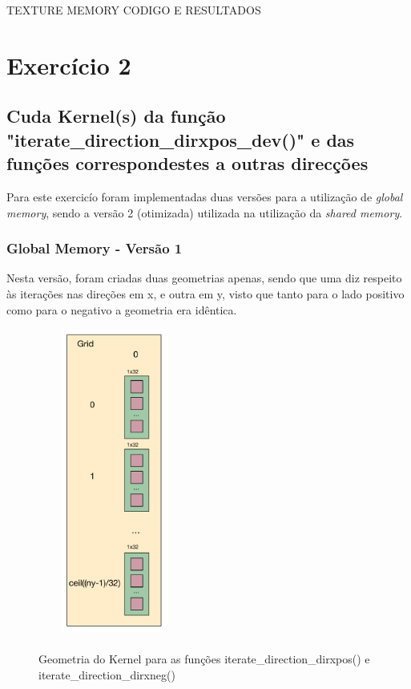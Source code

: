 \documentclass[pdftex,12pt,a4paper]{report}
\begin{document}
TEXTURE MEMORY CODIGO E RESULTADOS

\newpage
\section{Exercício 2}

\subsection{Cuda Kernel(s) da função "iterate\_direction\_dirxpos\_dev()" e das funções correspondestes a outras direcções}

Para este exercicío foram implementadas duas versões para a utilização de \textit{global memory}, sendo a versão 2 (otimizada) utilizada na utilização da \textit{shared memory}.

\subsubsection{Global Memory - Versão 1}

Nesta versão, foram criadas duas geometrias apenas, sendo que uma diz respeito às iterações nas direções em x, e outra em y, visto que tanto para o lado positivo como para o negativo a geometria era idêntica.

 \begin{figure}[!htb]
\center
 \includegraphics[width=50mm,height=100mm,scale=1]{IteratePositionDirxposneg_v1_kernel.pdf}
 \caption{\\ Geometria do Kernel para as funções iterate\_direction\_dirxpos() e iterate\_direction\_dirxneg()}
 \label{fig:IteratePositionDirxposneg_v1_kernel}
\end{figure}
\end{document}
